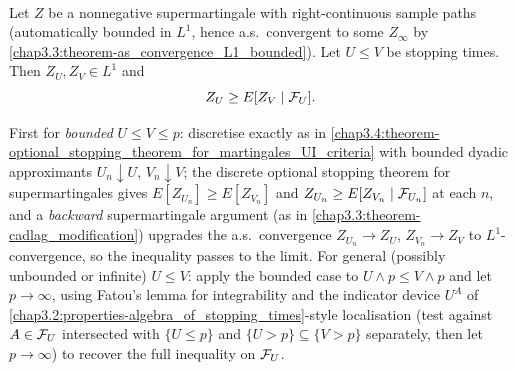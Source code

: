 \begin{proposition} \label{chap3.4:proposition-optional_stopping_nonnegative_supermartingales}  \\
Let $Z$ be a nonnegative supermartingale with right-continuous sample paths (automatically bounded in $L^1$, hence a.s.\ convergent to some $Z_\infty$ by \cref{chap3.3:theorem-as_convergence_L1_bounded}). Let $U\le V$ be stopping times. Then $Z_U,Z_V\in L^1$ and
$$Z_U\ge E[Z_V\mid\mathcal{F}_U].$$
\end{proposition}
\begin{proofidea}
First for \emph{bounded} $U\le V\le p$: discretise exactly as in \cref{chap3.4:theorem-optional_stopping_theorem_for_martingales_UI_criteria} with bounded dyadic approximants $U_n\downarrow U$, $V_n\downarrow V$; the discrete optional stopping theorem for supermartingales gives $E[Z_{U_n}]\ge E[Z_{V_n}]$ and $Z_{U_n}\ge E[Z_{V_n}\mid\mathcal{F}_{U_n}]$ at each $n$, and a \emph{backward} supermartingale argument (as in \cref{chap3.3:theorem-cadlag_modification}) upgrades the a.s.\ convergence $Z_{U_n}\to Z_U$, $Z_{V_n}\to Z_V$ to $L^1$-convergence, so the inequality passes to the limit. For general (possibly unbounded or infinite) $U\le V$: apply the bounded case to $U\wedge p\le V\wedge p$ and let $p\to\infty$, using Fatou's lemma for integrability and the indicator device $U^A$ of \cref{chap3.2:properties-algebra_of_stopping_times}-style localisation (test against $A\in\mathcal{F}_U$ intersected with $\{U\le p\}$ and $\{U>p\}\subseteq\{V>p\}$ separately, then let $p\to\infty$) to recover the full inequality on $\mathcal{F}_U$.
\end{proofidea}

